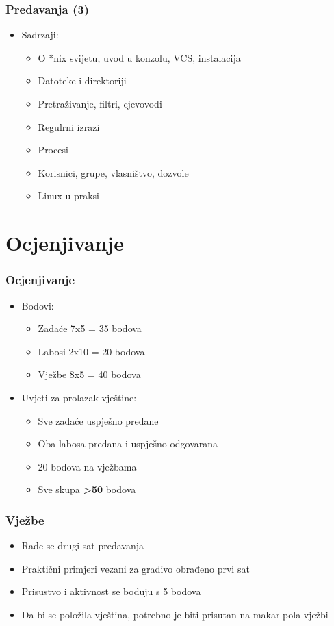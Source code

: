 \documentclass{beamer}
\begin{document}
\begin{frame}[t]
\frametitle{Predavanja (3)}
\begin{itemize}
	\item Sadrzaji:
	\begin{itemize}
		\item O *nix svijetu, uvod u konzolu, VCS, instalacija 
		\item Datoteke i direktoriji
		\item Pretraživanje, filtri, cjevovodi
    \item Regulrni izrazi 
		\item Procesi
		\item Korisnici, grupe, vlasništvo, dozvole
		\item Linux u praksi 
	\end{itemize}
\end{itemize}
\end{frame}

\section{Ocjenjivanje}
\begin{frame}[t]
\frametitle{Ocjenjivanje}
\begin{itemize}
	\item Bodovi:
	\begin{itemize}
		\item Zadaće 7x5  = 35 bodova
		\item Labosi 2x10 = 20 bodova
		\item Vježbe 8x5  = 40 bodova
	\end{itemize}
	\item Uvjeti za prolazak vještine:
	\begin{itemize}
		\item Sve zadaće uspješno predane
		\item Oba labosa predana i uspješno odgovarana
		\item 20 bodova na vježbama
		\item Sve skupa \textbf{\textgreater 50} bodova
	\end{itemize}
\end{itemize}
\end{frame}

\begin{frame}[t]
\frametitle{Vježbe}
\begin{itemize}
	\item Rade se drugi sat predavanja
	\item Praktični primjeri vezani za gradivo obrađeno prvi sat
	\item Prisustvo i aktivnost se boduju s 5 bodova
	\item Da bi se položila vještina, potrebno je biti prisutan na makar pola vježbi
\end{itemize}
\end{frame}
\end{document}
